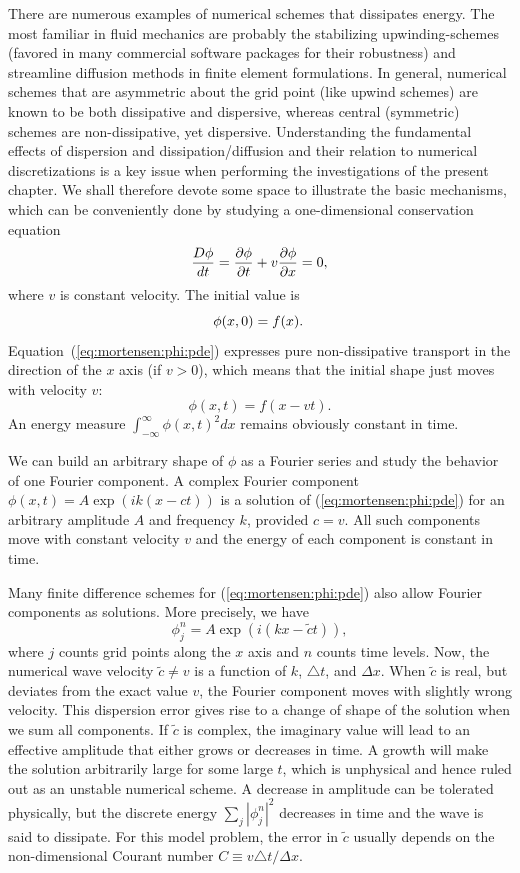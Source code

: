 There are numerous examples of numerical schemes that dissipates
energy. The most familiar in fluid mechanics are probably the
stabilizing upwinding-schemes (favored in many commercial software
packages for their robustness) and streamline diffusion methods in finite
element formulations. In general, numerical schemes that are asymmetric
about the grid point (like upwind schemes) are known to be both
dissipative and dispersive, whereas central (symmetric) schemes are
non-dissipative, yet dispersive. Understanding the fundamental effects
of dispersion and dissipation/diffusion and their relation to numerical
discretizations is a key issue when performing the investigations of
the present chapter. We shall therefore devote some space to illustrate
the basic mechanisms, which can be conveniently done by studying
a one-dimensional conservation equation
\begin{equation}
{D\phi\over dt} = {\partial\phi\over\partial t} + v{\partial\phi\over\partial x}
=0,
\label{eq:mortensen:phi:pde}
\end{equation}
where $v$ is constant velocity. The initial value is
\[ \phi(x,0)=f(x) . \thinspace\]
Equation~(\eqref{eq:mortensen:phi:pde}) expresses pure non-dissipative transport
in the direction of the $x$ axis (if $v>0$), which means that the initial
shape just moves with velocity $v$: 
\[ \phi(x,t) = f(x-vt).\]
An energy measure $\int_{-\infty}^\infty\phi(x,t)^2dx$ remains obviously
constant in time.

We can build an arbitrary shape of $\phi$ as a Fourier
series and study the behavior of one Fourier component. 
A complex Fourier component
$\phi (x,t)=A\exp{(ik(x - ct))}$ is a solution of (\eqref{eq:mortensen:phi:pde})
for an arbitrary amplitude $A$ and frequency $k$, provided $c = v$.
All such components move
with constant velocity $v$ and the energy of each component is constant
in time.

Many finite difference schemes for (\eqref{eq:mortensen:phi:pde}) also allow
Fourier components as solutions. More precisely, we have 
\[ \phi_j^n = A\exp{(i(kx - \tilde c t))},\]
where $j$ counts grid points along the $x$ axis and $n$ counts time levels.
Now, the numerical wave velocity $\tilde c \neq v$ is a function of 
$k$, $\triangle t$, and $\Delta x$.
When $\tilde c$ is real,
but deviates from the exact value $v$, the Fourier component moves
with slightly wrong velocity. This dispersion error gives rise to a change
of shape of the solution when we sum all components.
If $\tilde c$ is complex, the imaginary value will lead to an effective
amplitude that either grows or decreases in time. A growth will
make the solution arbitrarily large for some large $t$, which is unphysical
and hence ruled out as an unstable numerical scheme.
A decrease in amplitude can be tolerated physically,
but the discrete energy $\sum_j |\phi_j^n|^2$ decreases in time and the
wave is said to dissipate.
For this model problem,
the error in $\tilde c$ usually depends on the non-dimensional
Courant number $C\equiv v\triangle t/\Delta x$. 

